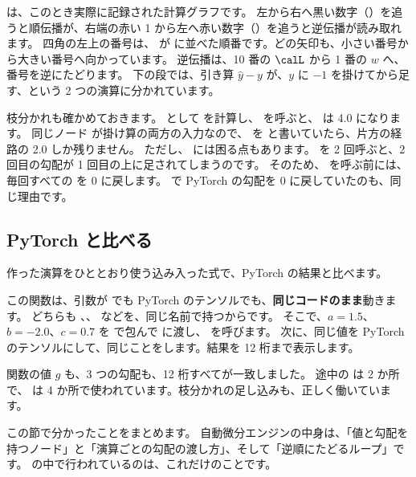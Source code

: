 は、このとき実際に記録された計算グラフです。
左から右へ黒い数字（）を追うと順伝播が、右端の赤い 1 から左へ赤い数字（）を追うと逆伝播が読み取れます。
四角の左上の番号は、 が  に並べた順番です。どの矢印も、小さい番号から大きい番号へ向かっています。
逆伝播は、10 番の $\calL$ から 1 番の $w$ へ、番号を逆にたどります。
下の段では、引き算 $\hat y-y$ が、$y$ に $-1$ を掛けてから足す、という 2 つの演算に分かれています。

枝分かれも確かめておきます。
 として  を計算し、 を呼ぶと、 は 4.0 になります。
同じノード  が掛け算の両方の入力なので、\code{+=} を \code{=} と書いていたら、片方の経路の 2.0 しか残りません。
ただし、\code{+=} には困る点もあります。 を 2 回呼ぶと、2 回目の勾配が 1 回目の上に足されてしまうのです。
そのため、 を呼ぶ前には、毎回すべての  を 0 に戻します。
で PyTorch の勾配を 0 に戻していたのも、同じ理由です。

\subsection*{PyTorch と比べる}

作った演算をひととおり使う込み入った式で、PyTorch の結果と比べます。


この関数は、引数が  でも PyTorch のテンソルでも、\textbf{同じコードのまま}動きます。
どちらも \code{+}、\code{*}、 などを、同じ名前で持つからです。
そこで、$a=1.5$、$b=-2.0$、$c=0.7$ を  で包んで  に渡し、 を呼びます。
次に、同じ値を PyTorch のテンソルにして、同じことをします。結果を 12 桁まで表示します。


関数の値 $g$ も、3 つの勾配も、12 桁すべてが一致しました。
途中の  は 2 か所で、 は 4 か所で使われています。枝分かれの足し込みも、正しく働いています。

この節で分かったことをまとめます。
自動微分エンジンの中身は、「値と勾配を持つノード」と「演算ごとの勾配の渡し方」、そして「逆順にたどるループ」です。
 の中で行われているのは、これだけのことです。

